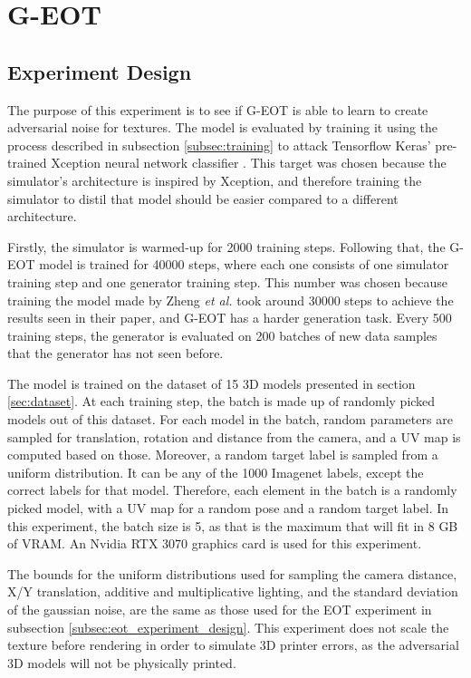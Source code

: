 \section{G-EOT}

\subsection{Experiment Design}
    \label{subsec:g_eot_experiment_design}

The purpose of this experiment is to see if G-EOT is able to learn to create adversarial noise for textures. The model is evaluated by training it using the process described in subsection \ref{subsec:training} to attack Tensorflow Keras' pre-trained Xception neural network classifier \cite{xception}. This target was chosen because the simulator's architecture is inspired by Xception, and therefore training the simulator to distil that model should be easier compared to a different architecture.

Firstly, the simulator is warmed-up for 2000 training steps. Following that, the G-EOT model is trained for 40000 steps, where each one consists of one simulator training step and one generator training step. This number was chosen because training the model made by Zheng \textit{et al.} \cite{zheng_black_box_GAN} took around 30000 steps to achieve the results seen in their paper, and G-EOT has a harder generation task. Every 500 training steps, the generator is evaluated on 200 batches of new data samples that the generator has not seen before.

The model is trained on the dataset of 15 3D models presented in section \ref{sec:dataset}. At each training step, the batch is made up of randomly picked models out of this dataset. For each model in the batch, random parameters are sampled for translation, rotation and distance from the camera, and a UV map is computed based on those. Moreover, a random target label is sampled from a uniform distribution. It can be any of the 1000 Imagenet labels, except the correct labels for that model. Therefore, each element in the batch is a randomly picked model, with a UV map for a random pose and a random target label. In this experiment, the batch size is 5, as that is the maximum that will fit in 8 GB of VRAM. An Nvidia RTX 3070 graphics card is used for this experiment.

The bounds for the uniform distributions used for sampling the camera distance, X/Y translation, additive and multiplicative lighting, and the standard deviation of the gaussian noise, are the same as those used for the EOT experiment in subsection \ref{subsec:eot_experiment_design}. This experiment does not scale the texture before rendering in order to simulate 3D printer errors, as the adversarial 3D models will not be physically printed.

